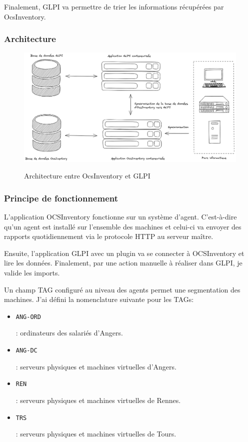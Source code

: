 \documentclass[12pt]{article}
\begin{document}
Finalement, \gls{GLPI} va permettre de trier les informations récupérées par OcsInventory.

\subsubsection{Architecture}
\begin{figure}[!ht]
    \centering
    \includegraphics[width=\textwidth]{src/graph_glpi.png}
    \label{fig:glpi}
    \caption{Architecture entre OcsInventory et \gls{GLPI}}
\end{figure}

\newpage
\subsubsection{Principe de fonctionnement}
L'application \gls{OCSInventory} fonctionne sur un système d'agent.
C'est-à-dire qu'un agent est installé sur l'ensemble des machines et celui-ci va envoyer des rapports quotidiennement via le protocole HTTP au serveur maître. 

Ensuite, l'application \gls{GLPI} avec un plugin va se connecter à \gls{OCSInventory} et lire les données.
Finalement, par une action manuelle à réaliser dans \gls{GLPI}, je valide les imports.

Un champ TAG configuré au niveau des agents permet une segmentation des machines.
J'ai défini la nomenclature suivante pour les TAGs:
\begin{itemize}
    \item \begin{code} \texttt{ANG-ORD} \end{code}: ordinateurs des salariés d'Angers.
    \item \begin{code} \texttt{ANG-DC} \end{code}: serveurs physiques et machines virtuelles d'Angers.
    \item \begin{code} \texttt{REN} \end{code}: serveurs physiques et machines virtuelles de Rennes.
    \item \begin{code} \texttt{TRS} \end{code}: serveurs physiques et machines virtuelles de Tours.
\end{itemize}
\end{document}
